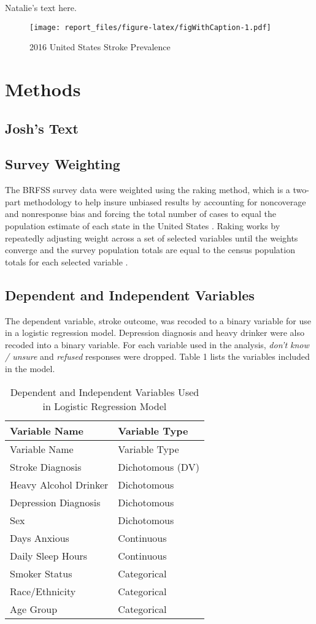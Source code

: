 \documentclass[11pt,]{article}
\begin{document}
Natalie's text here.

\begin{figure}
\centering
\texttt{[image: report\_files/figure-latex/figWithCaption-1.pdf]}
\caption{2016 United States Stroke Prevalence}
\end{figure}

\section{Methods}\label{methods}

\subsection{Josh's Text}\label{joshs-text}

\subsection{Survey Weighting}\label{survey-weighting}

The BRFSS survey data were weighted using the raking method, which is a
two-part methodology to help insure unbiased results by accounting for
noncoverage and nonresponse bias and forcing the total number of cases
to equal the population estimate of each state in the United States
\citep{CentersforDiseaseControlandPrevention2007a}. Raking works by
repeatedly adjusting weight across a set of selected variables until the
weights converge and the survey population totals are equal to the
census population totals for each selected variable \citep{Fricker1993}.

\subsection{Dependent and Independent
Variables}\label{dependent-and-independent-variables}

The dependent variable, stroke outcome, was recoded to a binary variable
for use in a logistic regression model. Depression diagnosis and heavy
drinker were also recoded into a binary variable. For each variable used
in the analysis, \emph{don't know / unsure} and \emph{refused} responses
were dropped. Table 1 lists the variables included in the model.

\begin{longtable}[]{@{}ll@{}}
\caption{Dependent and Independent Variables Used in Logistic Regression
Model}\tabularnewline
\toprule
Variable Name & Variable Type\tabularnewline
\midrule
\endfirsthead
\toprule
Variable Name & Variable Type\tabularnewline
\midrule
\endhead
Stroke Diagnosis & Dichotomous (DV)\tabularnewline
Heavy Alcohol Drinker & Dichotomous\tabularnewline
Depression Diagnosis & Dichotomous\tabularnewline
Sex & Dichotomous\tabularnewline
Days Anxious & Continuous\tabularnewline
Daily Sleep Hours & Continuous\tabularnewline
Smoker Status & Categorical\tabularnewline
Race/Ethnicity & Categorical\tabularnewline
Age Group & Categorical\tabularnewline
\bottomrule
\end{longtable}
\end{document}
